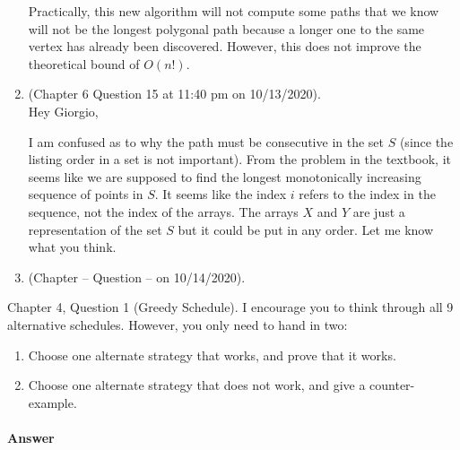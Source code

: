 \documentclass{article}
\begin{document}
\begin{enumerate}
        Practically, this new algorithm will not compute some paths that we know will not be the longest polygonal path because a longer one to the same vertex has already been discovered.
        However, this does not improve the theoretical bound of $O(n!)$.
    \item (Chapter 6 Question 15 at 11:40 pm on 10/13/2020). \\
        Hey Giorgio,

        I am confused as to why the path must be consecutive in the set $S$ (since the listing order in a set is not important).
        From the problem in the textbook, it seems like we are supposed to find the longest monotonically increasing sequence of points in $S$.
        It seems like the index $i$ refers to the index in the sequence, not the index of the arrays.
        The arrays $X$ and $Y$ are just a representation of the set $S$ but it could be put in any order.
        Let me know what you think.
    \item (Chapter -- Question -- on 10/14/2020). \\
\end{enumerate}


\nextprob
{}

Chapter 4, Question 1 (Greedy Schedule).  I encourage you to think through all 9
alternative schedules.  However, you only need to hand in two:
\begin{enumerate}
    \item Choose one alternate strategy that
        works, and prove that it works.
    \item Choose one alternate strategy that does not work, and give a
        counter-example.
\end{enumerate}

\paragraph{Answer}
\end{document}
